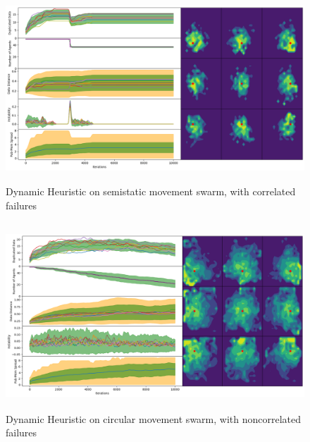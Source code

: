 \documentclass{UoYCSproject}
\begin{document}
\begin{figure}[htb]
\label{fig:static_movement_con2}
\begin{center}
\centering
\includegraphics[height=7cm]{"./Dynamic_Heuristic/Static_Move_con.png"}
\caption{Dynamic Heuristic on semi\-static movement swarm, with correlated failures}
\end{center}
\end{figure}

\begin{figure}[htb]
\label{fig:circle_movement_non2}
\begin{center}
\centering
\includegraphics[height=7cm]{"./Dynamic_Heuristic/Cicrle_Move_non.png"}
\caption{Dynamic Heuristic on circular movement swarm, with non\-correlated failures}
\end{center}
\end{figure}
\end{document}
